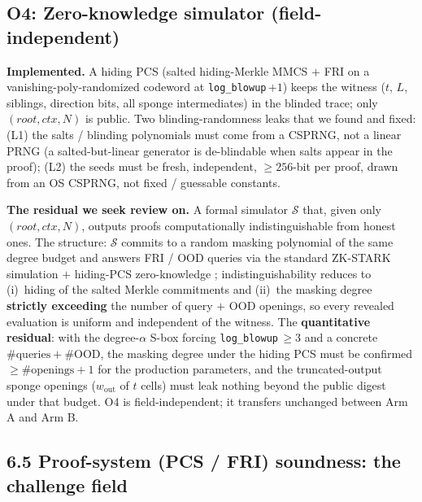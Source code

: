 \documentclass[11pt]{article}
\newcommand{\wout}{w_{\mathrm{out}}}
\theoremstyle{plain}
\theoremstyle{definition}
\begin{document}
\subsection*{O4: Zero-knowledge simulator (field-independent)}

\textbf{Implemented.} A hiding PCS (salted hiding-Merkle MMCS $+$ FRI on a vanishing-poly-randomized
codeword at \texttt{log\_blowup}\,$+1$) keeps the witness ($t$, $L$, siblings, direction bits, all
sponge intermediates) in the blinded trace; only $(\mathit{root}, \mathit{ctx}, N)$ is public. Two
blinding-randomness leaks that we found and fixed: (L1) the salts / blinding polynomials must come
from a CSPRNG, not a linear PRNG (a salted-but-linear generator is de-blindable when salts appear in
the proof); (L2) the seeds must be fresh, independent, $\geq 256$-bit per proof, drawn from an OS
CSPRNG, not fixed / guessable constants.

\textbf{The residual we seek review on.} A formal simulator $\mathcal{S}$ that, given only
$(\mathit{root}, \mathit{ctx}, N)$, outputs proofs computationally indistinguishable from honest
ones. The structure: $\mathcal{S}$ commits to a random masking polynomial of the same degree budget
and answers FRI / OOD queries via the standard ZK-STARK simulation \cite{BCRSVW19} $+$ hiding-PCS
zero-knowledge \cite{Hab22}; indistinguishability reduces to (i)~hiding of the salted Merkle
commitments and (ii)~the masking degree \textbf{strictly exceeding} the number of query $+$ OOD
openings, so every revealed evaluation is uniform and independent of the witness. The
\textbf{quantitative residual}: with the degree-$\alpha$ S-box forcing \texttt{log\_blowup}\,$\geq 3$ and a
concrete $\#\mathrm{queries} + \#\mathrm{OOD}$, the masking degree under the hiding PCS must be
confirmed $\geq \#\mathrm{openings} + 1$ for the production parameters, and the truncated-output
sponge openings ($\wout$ of $t$ cells) must leak nothing beyond the public digest under that budget.
O4 is field-independent; it transfers unchanged between Arm A and Arm B.

\subsection*{6.5 Proof-system (PCS / FRI) soundness: the challenge field}
\end{document}

